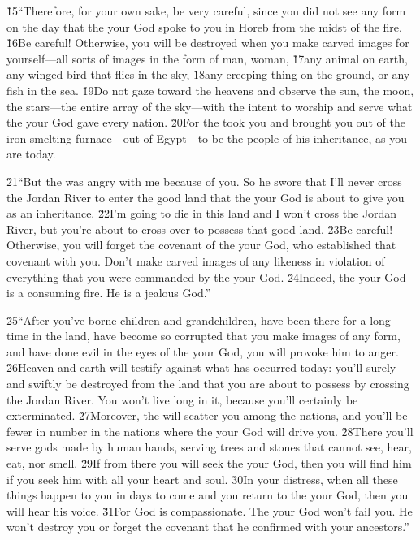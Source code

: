 \v{15}``Therefore, for your own sake, be very careful, since you did not see any form on the day that the  your God spoke to you in Horeb from the midst of the fire. \v{16}Be careful! Otherwise, you will be destroyed when you make carved images for yourself---all sorts of images in the form of man, woman, \v{17}any animal on earth, any winged bird that flies in the sky, \v{18}any creeping thing on the ground, or any fish in the sea. \v{19}Do not gaze toward the heavens and observe the sun, the moon, the stars---the entire array of the sky---with the intent to worship and serve what the  your God gave every nation. \v{20}For the  took you and brought you out of the iron-smelting furnace---out of Egypt---to be the people of his inheritance, as you are today.

\v{21}``But the  was angry with me because of you. So he swore that I'll never cross the Jordan River to enter the good land that the  your God is about to give you as an inheritance. \v{22}I'm going to die in this land and I won't cross the Jordan River, but you're about to cross over to possess that good land. \v{23}Be careful! Otherwise, you will forget the covenant of the  your God, who established that covenant with you. Don't make carved images of any likeness in violation of everything that you were commanded by the  your God. \v{24}Indeed, the  your God is a consuming fire. He is a jealous God.''

\v{25}``After you've borne children and grandchildren, have been there for a long time in the land, have become so corrupted that you make images of any form, and have done evil in the eyes of the  your God, you will provoke him to anger. \v{26}Heaven and earth will testify against what has occurred today: you'll surely and swiftly be destroyed from the land that you are about to possess by crossing the Jordan River. You won't live long in it, because you'll certainly be exterminated. \v{27}Moreover, the  will scatter you among the nations, and you'll be fewer in number in the nations where the  your God will drive you. \v{28}There you'll serve gods made by human hands, serving trees and stones that cannot see, hear, eat, nor smell. \v{29}If from there you will seek the  your God, then you will find him if you seek him with all your heart and soul. \v{30}In your distress, when all these things happen to you in days to come and you return to the  your God, then you will hear his voice. \v{31}For God is compassionate. The  your God won't fail you. He won't destroy you or forget the covenant that he confirmed with your ancestors.''


